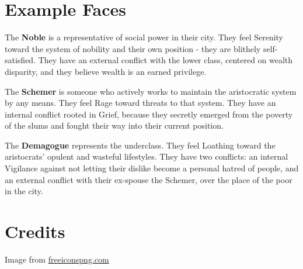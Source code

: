 \documentclass[10pt,oneside,letterpaper,landscape]{memoir}
\begin{document}
\begin{multicols}{3}
\section{Example Faces}

The \textbf{Noble} is a representative of social power in their city. They feel Serenity toward the system of nobility and their own position - they are blithely self-satisfied. They have an external conflict with the lower class, centered on wealth disparity, and they believe wealth is an earned privilege.

The \textbf{Schemer} is someone who actively works to maintain the aristocratic system by any means. They feel Rage toward threats to that system. They have an internal conflict rooted in Grief, because they secretly emerged from the poverty of the slums and fought their way into their current position.

The \textbf{Demagogue} represents the underclass. They feel Loathing toward the aristocrats' opulent and wasteful lifestyles.
They have two conflicts: an internal Vigilance against not letting their dislike become a personal hatred of people,
and an external conflict with their ex-spouse the Schemer, over the place of the poor in the city.

\section{Credits}

Image from  \href{https://www.freeiconspng.com/img/29507}{freeiconspng.com}

\end{multicols}

\end{document}
